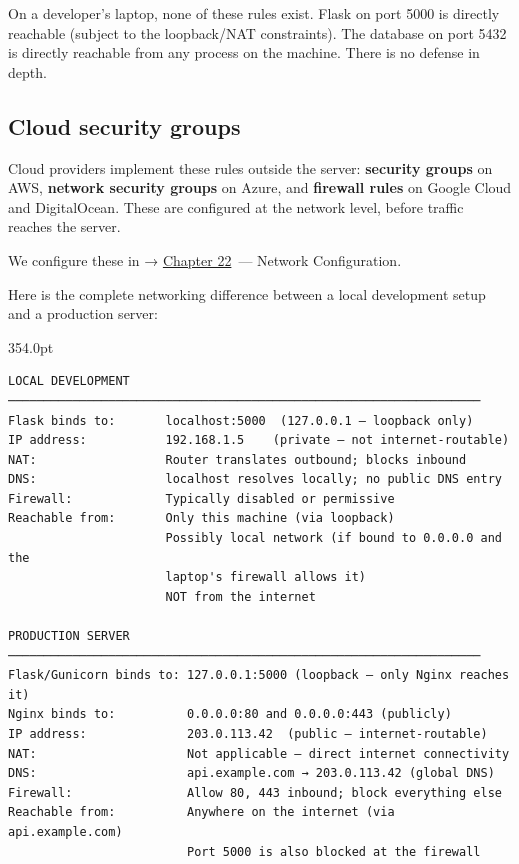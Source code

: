 \noindent{}On a developer's laptop, none of these rules exist. Flask on port 5000 is directly reachable (subject to the loopback/NAT constraints). The database on port 5432 is directly reachable from any process on the machine. There is no defense in depth.

\subsection*{Cloud security groups}\label{10-networking-limitations:cloud-security-groups}

Cloud providers implement these rules outside the server: \textbf{security groups} on AWS, \textbf{network security groups} on Azure, and \textbf{firewall rules} on Google Cloud and DigitalOcean. These are configured at the network level, before traffic reaches the server.

We configure these in → \hyperref[ch:22-network-configuration]{Chapter 22}~--- Network Configuration.

\label{10-networking-limitations:the-networking-picture-local-vs-production}

Here is the complete networking difference between a local development setup and a production server:

\begin{diagrambox}[short]{354.0pt}
\begin{Verbatim}[fontsize=\fontsize{9.0}{8.55}\selectfont]
LOCAL DEVELOPMENT
──────────────────────────────────────────────────────────────────
Flask binds to:       localhost:5000  (127.0.0.1 — loopback only)
IP address:           192.168.1.5    (private — not internet-routable)
NAT:                  Router translates outbound; blocks inbound
DNS:                  localhost resolves locally; no public DNS entry
Firewall:             Typically disabled or permissive
Reachable from:       Only this machine (via loopback)
                      Possibly local network (if bound to 0.0.0.0 and the
                      laptop's firewall allows it)
                      NOT from the internet

PRODUCTION SERVER
──────────────────────────────────────────────────────────────────
Flask/Gunicorn binds to: 127.0.0.1:5000 (loopback — only Nginx reaches it)
Nginx binds to:          0.0.0.0:80 and 0.0.0.0:443 (publicly)
IP address:              203.0.113.42  (public — internet-routable)
NAT:                     Not applicable — direct internet connectivity
DNS:                     api.example.com → 203.0.113.42 (global DNS)
Firewall:                Allow 80, 443 inbound; block everything else
Reachable from:          Anywhere on the internet (via api.example.com)
                         Port 5000 is also blocked at the firewall
\end{Verbatim}
\end{diagrambox}

